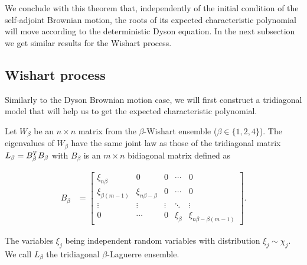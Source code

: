    We conclude with this theorem that, independently of the initial condition of the self-adjoint Brownian motion, the roots of its expected characteristic polynomial will move according to the deterministic Dyson equation. In the next subsection we get similar results for the Wishart process.

\subsection{Wishart process} \label{subsec:wishart_laguerre}

    Similarly to the Dyson Brownian motion case, we will first construct a tridiagonal model that will help us to get the expected characteristic polynomial.

\begin{lemma} 
    Let $W_\beta$ be an $n\times n$ matrix from the  $\beta$-Wishart ensemble ($\beta \in \{1,2,4\}$). The eigenvalues of $W_\beta$ have the same joint law as those of the tridiagonal matrix $L_\beta = B_\beta^T  B_\beta$ with $B_\beta$ is an $m\times n$ bidiagonal matrix defined as 

    \begin{align} \label{eq:tridiag_laguerre}
        B_\beta &= \begin{bmatrix}
            \xi_{n\beta}   & 0 & 0     & \cdots & 0 \\ 
            \xi_{\beta(m-1)} & \xi_{n\beta - \beta}   & 0 & \cdots & 0 \\
            \vdots & \vdots & \vdots & \ddots & \vdots \\ 
            0      & \cdots & 0      & \xi_{\beta} & \xi_{n\beta - \beta(m-1)} 
        \end{bmatrix}.
    \end{align}

    The variables $\xi_j$ being independent random variables with distribution $\xi_j \sim \chi_j$. We call $L_\beta$ the tridiagonal $\beta$-Laguerre ensemble.
\end{lemma}

